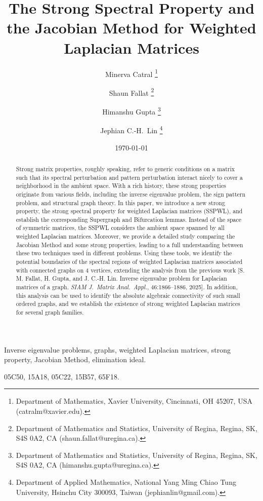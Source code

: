 \documentclass{article}
\title{The Strong Spectral Property and the Jacobian Method for Weighted Laplacian Matrices}
\author{
Minerva Catral
\thanks{Department of Mathematics, Xavier University, Cincinnati, OH 45207, USA 
(catralm@xavier.edu).}
\and 
Shaun Fallat
\thanks{Department of Mathematics and Statistics, University of Regina, Regina, SK, S4S 0A2, CA 
(shaun.fallat@uregina.ca).}
\and
Himanshu Gupta
\thanks{Department of Mathematics and Statistics, University of Regina, Regina, SK, S4S 0A2, CA
(himanshu.gupta@uregina.ca).}
\and
Jephian C.-H.~Lin
\thanks{Department of Applied Mathematics, National Yang Ming Chiao Tung University, Hsinchu City 300093, Taiwan 
(jephianlin@gmail.com).}
}
\date{\today}
\theoremstyle{definition}
\begin{document}
\maketitle

\begin{abstract}
Strong matrix properties, roughly speaking, refer to generic conditions on a matrix such that its spectral perturbation and pattern perturbation interact nicely to cover a neighborhood in the ambient space.  With a rich history, these strong properties originate from various fields, including the inverse eigenvalue problem, the sign pattern problem, and structural graph theory.  In this paper, we introduce a new strong property, the strong spectral property for weighted Laplacian matrices (SSPWL), and establish the corresponding Supergraph and Bifurcation lemmas.  Instead of the space of symmetric matrices, the SSPWL considers the ambient space spanned by all weighted Laplacian matrices.  Moreover, we provide a detailed study comparing the Jacobian Method and some strong properties, leading to a full understanding between these two techniques used in different problems.  Using these tools, we identify the potential boundaries of the spectral regions of weighted Laplacian matrices associated with connected graphs on $4$ vertices, extending the analysis from the previous work [S. M. Fallat, H. Gupta, and J. C.-H. Lin. Inverse eigenvalue problem for Laplacian matrices of a graph. \emph{SIAM J.\ Matrix Anal.\ Appl.}, 46:1866–1886, 2025]. In addition, this analysis can be used to identify the absolute algebraic connectivity of such small ordered graphs, and we establish the existence of strong weighted Laplacian matrices for several graph families. 
\end{abstract}  

Inverse eigenvalue problems, graphs, weighted Laplacian matrices, strong property, Jacobian Method, elimination ideal.

\medskip

05C50, %
15A18, %
05C22, %
15B57, %
65F18. %
\end{document}
